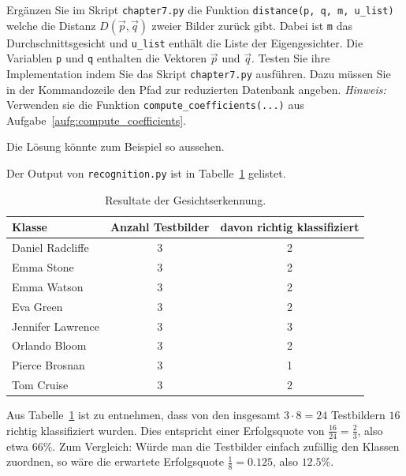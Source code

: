 \begin{aufgabe} \label{aufg:quantification_code}
	Ergänzen Sie im Skript \texttt{chapter7.py} die Funktion \texttt{distance(p, q, m, u\_list)} welche die Distanz $D\left(\vec p,\vec q\right)$ zweier Bilder zurück gibt.
	Dabei ist \texttt{m} das Durchschnittsgesicht und \texttt{u\_list} enthält die Liste der Eigengesichter.
	Die Variablen \texttt{p} und \texttt{q} enthalten die Vektoren $\vec p$ und $\vec q$.
	Testen Sie ihre Implementation indem Sie das Skript \texttt{chapter7.py} ausführen.
	Dazu müssen Sie in der Kommandozeile den Pfad zur reduzierten Datenbank angeben.
	\textit{Hinweis:} Verwenden sie die Funktion \texttt{compute\_coefficients(...)} aus Aufgabe~\ref{aufg:compute_coefficients}.
\end{aufgabe}
\begin{losung}
	Die Lösung könnte zum Beispiel so aussehen.

	Der Output von \texttt{recognition.py} ist in Tabelle~\ref{tab:recognition} gelistet.
\end{losung}
\begin{table}[ht]
	\centering
	\begin{tabular}{|l|c|c|}
		\hline
		\textbf{Klasse} & \textbf{Anzahl Testbilder} & \textbf{davon richtig klassifiziert} \\ \hline
		Daniel Radcliffe & 3 & 2 \\ \hline
		Emma Stone & 3 & 2 \\ \hline
		Emma Watson & 3 & 2 \\ \hline
		Eva Green & 3 & 2 \\ \hline
		Jennifer Lawrence & 3 & 3 \\ \hline
		Orlando Bloom & 3 & 2 \\ \hline
		Pierce Brosnan & 3 & 1 \\ \hline
		Tom Cruise & 3 & 2 \\ \hline
	\end{tabular}
	\caption{Resultate der Gesichtserkennung.}
	\label{tab:recognition}
\end{table}
Aus Tabelle~\ref{tab:recognition} ist zu entnehmen, dass von den insgesamt $3\cdot8=24$ Testbildern $16$ richtig klassifiziert wurden.
Dies entspricht einer Erfolgsquote von $\frac{16}{24}=\frac{2}{3}$, also etwa $66\%$.
Zum Vergleich: Würde man die Testbilder einfach zufällig den Klassen zuordnen, so wäre die erwartete Erfolgsquote $\frac{1}{8}=0.125$, also $12.5\%$.